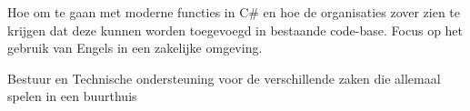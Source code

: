 \documentclass[
	a4paper,
	logowidth=180pt,
	logospace=10pt,
	nameandjobposition=before,
	logoposition=before,
	nameandjobposition=after,
	profilepicstyle=profilecircle
]{babelviscv}
\begin{document}
	\begin{cvtable}[1.5]
			{Hoe om te gaan met moderne functies in C\# en hoe de organisaties zover zien te krijgen dat deze kunnen worden toegevoegd in bestaande code-base.}
			{Focus op het gebruik van Engels in een zakelijke omgeving.}
	\end{cvtable}

		\begin{cvtable}[1.5]
				{Bestuur en Technische ondersteuning voor de verschillende zaken die allemaal spelen in een buurthuis}
		\end{cvtable}


\cvsignature
\end{document}
